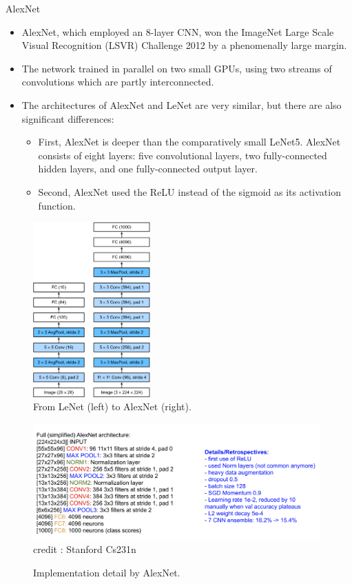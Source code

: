 \begin{vbframe}{AlexNet}
  \begin{itemize}
    \item AlexNet, which employed an 8-layer CNN, won the ImageNet Large Scale Visual Recognition (LSVR) Challenge 2012 by a phenomenally large margin.
    \item The network trained in parallel on two small GPUs, using two streams of convolutions which are partly interconnected.
    \item The architectures of AlexNet and LeNet are very similar, but there are also significant differences: 
       \begin{itemize}
          \item First, AlexNet is deeper than the comparatively small LeNet5. AlexNet consists of eight layers: five convolutional layers, two fully-connected hidden layers, and one fully-connected output layer. 
          \item Second, AlexNet used the ReLU instead of the sigmoid as its activation function. 
       \end{itemize}
  \end{itemize}
    \begin{figure}
        \centering
        \includegraphics[width=4.5cm]{plots/moderncnn/alexnet.png}
        \caption{From LeNet (left) to AlexNet (right).}
    \end{figure}
    
        \begin{figure}
        \centering
        \includegraphics[width=11cm]{plots/moderncnn/alexnet_detail.png}
                    \tiny{\\ credit : Stanford Cs231n}
        \caption{Implementation detail by AlexNet.}
    \end{figure}
    
\end{vbframe}

